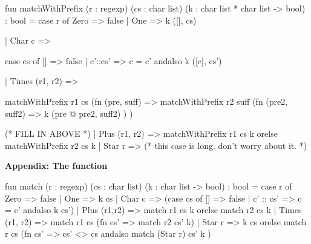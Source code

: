 \documentclass[addpoints,12pt, answers]{exam}
\begin{document}
\begin{questions}
\begin{parts}
  \begin{codeblock}
    fun matchWithPrefix
          (r : regexp)
          (cs : char list)
          (k : char list * char list -> bool) : bool =
      case r of
        Zero => false
      | One => k ([], cs)
  \end{codeblock}
  \vspace{-12pt}
  \begin{codeblock}[autogobble=false]
  | Char c =>
  \end{codeblock}
  \vspace{-24pt}
  \begin{solutionorbox}[13em]
    \begin{codeblock}
            case cs of
              [] => false
            | c'::cs' =>
                c = c' andalso k ([c], cs')
    \end{codeblock}
  \end{solutionorbox}
  \begin{codeblock}[autogobble=false]
  | Times (r1, r2) =>
  \end{codeblock}
  \vspace{-24pt}
  \begin{solutionorbox}[13em]
    \begin{codeblock}
            matchWithPrefix r1 cs (fn (pre, suff) =>
              matchWithPrefix r2 suff (fn (pre2, suff2) =>
                k (pre @ pre2, suff2)
              )
            )
    \end{codeblock}
  \end{solutionorbox}
  \begin{codeblock}
    (* FILL IN ABOVE *)
      | Plus (r1, r2) =>
          matchWithPrefix r1 cs k orelse matchWithPrefix r2 cs k
      | Star r =>
          (* this case is long. don't worry about it. *)
  \end{codeblock}
\end{parts}

\newpage

\textbf{Appendix: The  function}

\vspace{10pt}

\begin{codeblock}
  fun match (r : regexp)
            (cs : char list)
            (k : char list -> bool) : bool =
    case r of
      Zero => false
    | One => k cs
    | Char c => (case cs of
        [] => false
      | c' :: cs' => c = c' andalso k cs')
    | Plus (r1,r2) => match r1 cs k orelse match r2 cs k
    | Times (r1, r2) => match r1 cs (fn cs' => match r2 cs' k)
    | Star r =>
        k cs orelse
        match r cs (fn cs' =>
          cs' <> cs andalso match (Star r) cs' k
        )
\end{codeblock}




\end{questions}
\end{document}
